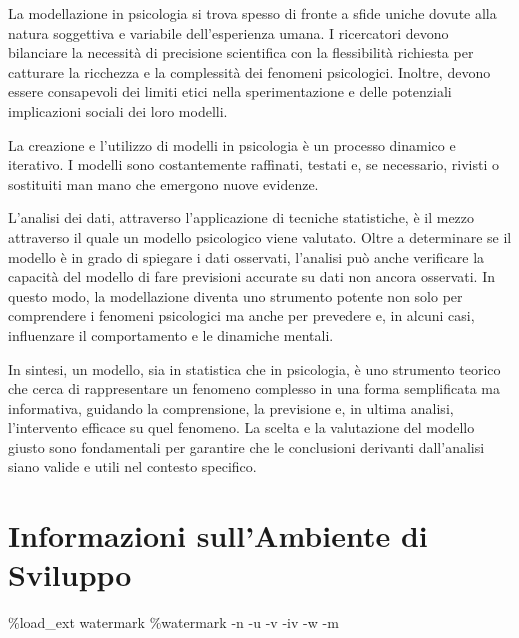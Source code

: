 \documentclass[
  letterpaper,
  krantz2]{{[}./krantz{]}}
\newenvironment{Shaded}{\begin{snugshade}}{\end{snugshade}}
\newcommand{\NormalTok}[1]{\textcolor[rgb]{0.00,0.23,0.31}{#1}}
\newcommand{\OperatorTok}[1]{\textcolor[rgb]{0.37,0.37,0.37}{#1}}
\begin{document}
La modellazione in psicologia si trova spesso di fronte a sfide uniche
dovute alla natura soggettiva e variabile dell'esperienza umana. I
ricercatori devono bilanciare la necessità di precisione scientifica con
la flessibilità richiesta per catturare la ricchezza e la complessità
dei fenomeni psicologici. Inoltre, devono essere consapevoli dei limiti
etici nella sperimentazione e delle potenziali implicazioni sociali dei
loro modelli.

La creazione e l'utilizzo di modelli in psicologia è un processo
dinamico e iterativo. I modelli sono costantemente raffinati, testati e,
se necessario, rivisti o sostituiti man mano che emergono nuove
evidenze.

L'analisi dei dati, attraverso l'applicazione di tecniche statistiche, è
il mezzo attraverso il quale un modello psicologico viene valutato.
Oltre a determinare se il modello è in grado di spiegare i dati
osservati, l'analisi può anche verificare la capacità del modello di
fare previsioni accurate su dati non ancora osservati. In questo modo,
la modellazione diventa uno strumento potente non solo per comprendere i
fenomeni psicologici ma anche per prevedere e, in alcuni casi,
influenzare il comportamento e le dinamiche mentali.

In sintesi, un modello, sia in statistica che in psicologia, è uno
strumento teorico che cerca di rappresentare un fenomeno complesso in
una forma semplificata ma informativa, guidando la comprensione, la
previsione e, in ultima analisi, l'intervento efficace su quel fenomeno.
La scelta e la valutazione del modello giusto sono fondamentali per
garantire che le conclusioni derivanti dall'analisi siano valide e utili
nel contesto specifico.

\section{Informazioni sull'Ambiente di
Sviluppo}\label{informazioni-sullambiente-di-sviluppo-8}

\begin{Shaded}
\begin{Highlighting}[]
\OperatorTok{\%}\NormalTok{load\_ext watermark}
\OperatorTok{\%}\NormalTok{watermark }\OperatorTok{{-}}\NormalTok{n }\OperatorTok{{-}}\NormalTok{u }\OperatorTok{{-}}\NormalTok{v }\OperatorTok{{-}}\NormalTok{iv }\OperatorTok{{-}}\NormalTok{w }\OperatorTok{{-}}\NormalTok{m}
\end{Highlighting}
\end{Shaded}
\end{document}
